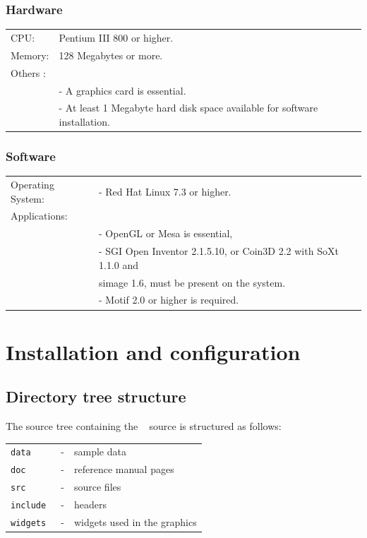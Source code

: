 \subsubsection{Hardware}

\begin{tabular}{l l}
        CPU: & Pentium III 800 or higher.\\
        Memory: & 128 Megabytes or more.\\
        Others : &\\
         & - A graphics card is essential.\\
         & - At least 1 Megabyte hard disk space available for software installation.\\
\end{tabular}


\subsubsection{Software}

\begin{tabular}{l l}
        Operating System: & - Red Hat Linux 7.3 or higher.\\
        Applications:\\
        & - OpenGL or Mesa is essential,\\
        & - SGI Open Inventor 2.1.5.10, or Coin3D 2.2 with SoXt 1.1.0 and \\
		& simage 1.6, must be present on the system.\\
        & - Motif 2.0 or higher is required.\\
\end{tabular}

\section{Installation and configuration}

\subsection{Directory tree structure}

The source tree containing the \PLAUT~ source is structured as follows:

\begin{tabular}{l c l}
        \tt{data}    & - & sample data\\
        \tt{doc}      & -  & reference manual pages\\
        \tt{src}      & -  & source files \\
        \tt{include}  & -  & headers\\ 
        \tt{widgets}  & -  & widgets used in the graphics\\ 
\end{tabular}


